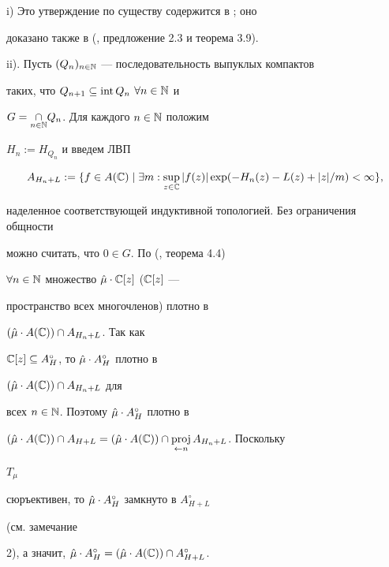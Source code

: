 \begin{pf} i) Это утверждение по существу содержится в \cite{Epi1}; оно 


доказано также в (\cite{Momm1}, предложение 2.3 и теорема 3.9). 


 


ii). Пусть $(Q_n)_{n\in\Bbb N}$ --- последовательность выпуклых компактов 


таких, что $Q_{n+1}\subseteq\operatorname{int} Q_n$ $\forall n\in\Bbb N$ и 


$G=\underset{n\in\Bbb N}{\cap}Q_n$. Для каждого $n\in\Bbb N$ положим 


$H_n:=H_{Q_n}$ и введем ЛВП 


$$ 


A_{H_n+L}:=\{f\in A(\Bbb C)\mid\exists m:\sup_{z\in\Bbb C} 


|f(z)|\exp(-H_n(z)-L(z)+|z|/m)<\infty\}, 


$$ 


наделенное соответствующей индуктивной топологией. Без ограничения общности 


можно считать, что $0\in G$. По (\cite{Kra}, теорема 4.4) 


$\forall n\in\Bbb N$ множество $\Hat\mu\cdot\Bbb C[z]$ ($\Bbb C[z]$ --- 


пространство всех многочленов) плотно в 


$(\Hat\mu\cdot A(\Bbb C))\cap A_{H_n+L}$. Так как 


$\Bbb C[z]\subseteq A^\circ_H$, то $\Hat\mu\cdot A^\circ_H$ плотно в 


$(\Hat\mu\cdot A(\Bbb C))\cap A_{H_n+L}$ для 


всех $n\in\Bbb N$. Поэтому $\Hat\mu\cdot A^\circ_H$ плотно в 


$(\Hat\mu\cdot A(\Bbb C))\cap A_{H+L}= 


(\Hat\mu\cdot A(\Bbb C))\cap \proj\limits_{\gets n}A_{H_n+L}$. Поскольку 


$T_\mu$ 


сюръективен, то $\Hat\mu\cdot A^\circ_H$ замкнуто в $A^\circ_{H+L}$ 


(см. замечание 


2), а значит, $\Hat\mu\cdot A^\circ_H=(\Hat\mu\cdot A(\Bbb C))\cap 


A^\circ_{H+L}$. 


\end{pf}


 


